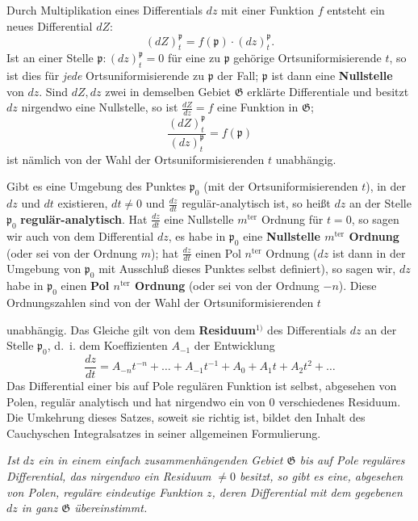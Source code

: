 \documentclass{article}
\begin{document}
Durch Multiplikation eines Differentials $dz$ mit einer Funktion $f$ entsteht ein neues Differential $dZ$:
\[ (dZ)_t^\mathfrak{p} = f(\mathfrak{p}) \cdot (dz)_t^\mathfrak{p}. \]
Ist an einer Stelle $\mathfrak{p}\colon (dz)_t^\mathfrak{p} = 0$ für eine zu $\mathfrak{p}$ gehörige Ortsuniformisierende $t$, so ist dies für \emph{jede} Ortsuniformisierende zu $\mathfrak{p}$ der Fall; $\mathfrak{p}$ ist dann eine \textbf{Nullstelle} von $dz$. Sind $dZ, dz$ zwei in demselben Gebiet $\mathfrak{G}$ erklärte Differentiale und besitzt $dz$ nirgendwo eine Nullstelle, so ist $\frac{dZ}{dz} = f$ eine Funktion in $\mathfrak{G}$;
\[ \frac{(dZ)_t^\mathfrak{p}}{(dz)_t^\mathfrak{p}} = f(\mathfrak{p}) \]
ist nämlich von der Wahl der Ortsuniformisierenden $t$ unabhängig.

Gibt es eine Umgebung des Punktes $\mathfrak{p}_0$ (mit der Ortsuniformisierenden $t$), in der $dz$ und $dt$ existieren, $dt \neq 0$ und $\frac{dz}{dt}$ regulär-analytisch ist, so heißt $dz$ an der Stelle $\mathfrak{p}_0$ \textbf{regulär-analytisch}. Hat $\frac{dz}{dt}$ eine Nullstelle $m^{\text{ter}}$ Ordnung für $t = 0$, so sagen wir auch von dem Differential $dz$, es habe in $\mathfrak{p}_0$ eine \textbf{Nullstelle $m^{\text{ter}}$ Ordnung} (oder sei von der Ordnung $m$); hat $\frac{dz}{dt}$ einen Pol $n^{\text{ter}}$ Ordnung ($dz$ ist dann in der Umgebung von $\mathfrak{p}_0$ mit Ausschluß dieses Punktes selbst definiert), so sagen wir, $dz$ habe in $\mathfrak{p}_0$ einen \textbf{Pol $n^{\text{ter}}$ Ordnung} (oder sei von der Ordnung $-n$). Diese Ordnungszahlen sind von der Wahl der Ortsuniformisierenden $t$

unabhängig. Das Gleiche gilt von dem \textbf{Residuum}${}^{1)}$ des Differentials $dz$ an der Stelle $\mathfrak{p}_0$, d.~i. dem Koeffizienten $A_{-1}$ der Entwicklung
\[ \frac{dz}{dt} = A_{-n} t^{-n} + \dots + A_{-1} t^{-1} + A_0 + A_1 t + A_2 t^2 + \dots \]
Das Differential einer bis auf Pole regulären Funktion ist selbst, abgesehen von Polen, regulär analytisch und hat nirgendwo ein von $0$ verschiedenes Residuum. Die Umkehrung dieses Satzes, soweit sie richtig ist, bildet den Inhalt des Cauchyschen Integralsatzes in seiner allgemeinen Formulierung.

\emph{Ist $dz$ ein in einem einfach zusammenhängenden Gebiet $\mathfrak{G}$ bis auf Pole reguläres Differential, das nirgendwo ein Residuum $\neq 0$ besitzt, so gibt es eine, abgesehen von Polen, reguläre eindeutige Funktion $z$, deren Differential mit dem gegebenen $dz$ in ganz $\mathfrak{G}$ übereinstimmt.}
\end{document}
